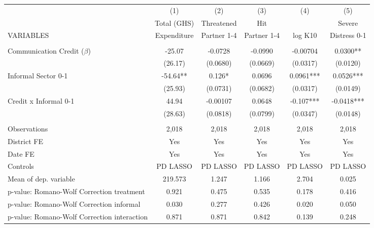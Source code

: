 \begin{tabular}{lccccc} \hline
 & (1) & (2) & (3) & (4) & (5) \\
 & Total (GHS) & Threatened & Hit &  & Severe \\
VARIABLES & Expenditure & Partner 1-4 & Partner 1-4 & log K10 & Distress 0-1 \\ \hline
 &  &  &  &  &  \\
Communication Credit ($\beta$) & -25.07 & -0.0728 & -0.0990 & -0.00704 & 0.0300** \\
 & (26.17) & (0.0680) & (0.0669) & (0.0317) & (0.0120) \\
Informal Sector 0-1 & -54.64** & 0.126* & 0.0696 & 0.0961*** & 0.0526*** \\
 & (25.93) & (0.0731) & (0.0682) & (0.0317) & (0.0149) \\
Credit x Informal 0-1 & 44.94 & -0.00107 & 0.0648 & -0.107*** & -0.0418*** \\
 & (28.63) & (0.0818) & (0.0799) & (0.0347) & (0.0148) \\
 &  &  &  &  &  \\
Observations & 2,018 & 2,018 & 2,018 & 2,018 & 2,018 \\
District FE & Yes & Yes & Yes & Yes & Yes \\
Date FE & Yes & Yes & Yes & Yes & Yes \\
Controls & PD LASSO & PD LASSO & PD LASSO & PD LASSO & PD LASSO \\
Mean of dep. variable & 219.573 & 1.247 & 1.166 & 2.704 & 0.025 \\
p-value: Romano-Wolf Correction treatment & 0.921 & 0.475 & 0.535 & 0.178 & 0.416 \\
p-value: Romano-Wolf Correction informal & 0.030 & 0.277 & 0.426 & 0.020 & 0.050 \\
 p-value: Romano-Wolf Correction interaction & 0.871 & 0.871 & 0.842 & 0.139 & 0.248 \\ \hline
\end{tabular}
